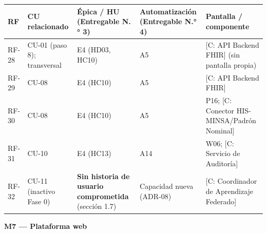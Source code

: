 \documentclass[11pt,a4paper]{article}
\begin{document}
{\small
\begin{longtable}[]{@{}
  >{\raggedright\arraybackslash}p{}
  >{\raggedright\arraybackslash}p{}
  >{\raggedright\arraybackslash}p{}
  >{\raggedright\arraybackslash}p{}
  >{\raggedright\arraybackslash}p{}@{}}
\toprule\noalign{}
\begin{minipage}[b]{\linewidth}\raggedright
RF
\end{minipage} & \begin{minipage}[b]{\linewidth}\raggedright
CU relacionado
\end{minipage} & \begin{minipage}[b]{\linewidth}\raggedright
Épica / HU (Entregable N.° 3)
\end{minipage} & \begin{minipage}[b]{\linewidth}\raggedright
Automatización (Entregable N.° 4)
\end{minipage} & \begin{minipage}[b]{\linewidth}\raggedright
Pantalla / componente
\end{minipage} \\
\midrule\noalign{}
\endhead
\bottomrule\noalign{}
\endlastfoot
RF-28 & CU-01 (paso 8); transversal & E4 (HD03, HC10) & A5 & {[}C: API Backend FHIR{]} (sin pantalla propia) \\
RF-29 & CU-08 & E4 (HC10) & A5 & {[}C: API Backend FHIR{]} \\
RF-30 & CU-08 & E4 (HC10) & A5 & P16; {[}C: Conector HIS-MINSA/Padrón Nominal{]} \\
RF-31 & CU-10 & E4 (HC13) & A14 & W06; {[}C: Servicio de Auditoría{]} \\
RF-32 & CU-11 (inactivo Fase 0) & \textbf{Sin historia de usuario comprometida} (sección 1.7) & Capacidad nueva (ADR-08) & {[}C: Coordinador de Aprendizaje Federado{]} \\
\end{longtable}
}

\textbf{M7 --- Plataforma web}
\end{document}
